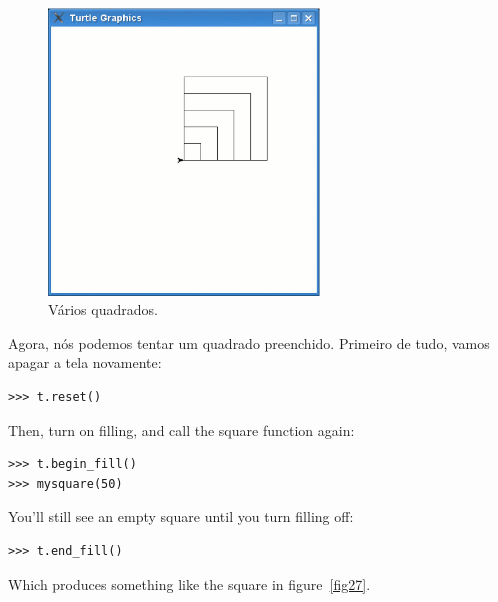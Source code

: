 \begin{figure}
\begin{center}
\includegraphics[width=72mm]{eps/figure26.eps}
\end{center}
\caption{Vários quadrados.}\label{fig26}
\end{figure}

\noindent
Agora, nós podemos tentar um quadrado preenchido. Primeiro de tudo, vamos apagar a tela novamente:

\begin{listing}
\begin{verbatim}
>>> t.reset()
\end{verbatim}
\end{listing}

\noindent
Then, turn on filling, and call the square function again:

\begin{listing}
\begin{verbatim}
>>> t.begin_fill()
>>> mysquare(50)
\end{verbatim}
\end{listing}

\noindent
You'll still see an empty square until you turn filling off:

\begin{listing}
\begin{verbatim}
>>> t.end_fill()
\end{verbatim}
\end{listing}

\noindent
Which produces something like the square in figure~\ref{fig27}.

